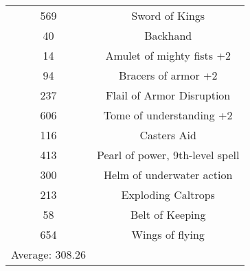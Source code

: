 \documentclass[letterpaper, 10pt]{article}
\begin{document}
\begin{center}
\begin{tabular}{|| c c ||}
    569 & Sword of Kings\\
    40  & Backhand\\
    14  & Amulet of mighty fists +2\\
    94  & Bracers of armor +2\\
    237 & Flail of Armor Disruption\\
    606 & Tome of understanding +2\\
    116 & Casters Aid\\
    413 & Pearl of power, 9th-level spell\\
    300 & Helm of underwater action\\
    213 & Exploding Caltrops\\
    58  & Belt of Keeping\\
    654 & Wings of flying\\
    \hline
    Average: 308.26 & \\
    \hline
    \hline
    \end{tabular}
\end{center}
\newpage
\end{document}

